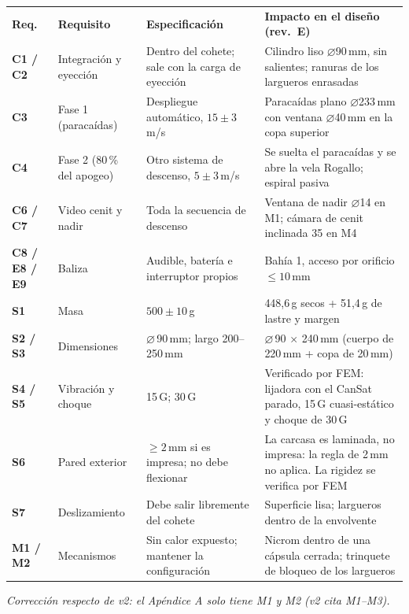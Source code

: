 \documentclass[10pt,a4paper]{article}
\newcommand{\diam}{\ensuremath{\varnothing}}
\newcommand{\nota}[1]{{\par\small\itshape\color{gris}#1\par}\medskip}
\begin{document}
\par{\footnotesize\noindent\begin{tabularx}{\linewidth}{P{1.7cm}P{2.6cm}P{3.6cm}L}
\color{white}\bfseries Req. & \color{white}\bfseries Requisito & \color{white}\bfseries Especificación & \color{white}\bfseries Impacto en el diseño (rev.\ E) \\
\bfseries C1 / C2 & Integración y eyección & Dentro del cohete; sale con la carga de eyección & Cilindro liso \diam90\,mm, sin salientes; ranuras de los largueros enrasadas \\
\bfseries C3 & Fase 1 (paracaídas) & Despliegue automático, $15 \pm 3$\,m/s & Paracaídas plano \diam233\,mm con ventana \diam40\,mm en la copa superior \\
\bfseries C4 & Fase 2 (80\,\% del apogeo) & Otro sistema de descenso, $5 \pm 3$\,m/s & Se suelta el paracaídas y se abre la vela Rogallo; espiral pasiva \\
\bfseries C6 / C7 & Video cenit y nadir & Toda la secuencia de descenso & Ventana de nadir \diam14 en M1; cámara de cenit inclinada 35\textdegree{} en M4 \\
\bfseries C8 / E8 / E9 & Baliza & Audible, batería e interruptor propios & Bahía 1, acceso por orificio $\leq 10$\,mm \\
\bfseries S1 & Masa & $500 \pm 10$\,g & 448,6\,g secos + 51,4\,g de lastre y margen \\
\bfseries S2 / S3 & Dimensiones & \diam\,90\,mm; largo 200--250\,mm & \diam\,90 $\times$ 240\,mm (cuerpo de 220\,mm + copa de 20\,mm) \\
\bfseries S4 / S5 & Vibración y choque & 15\,G; 30\,G & Verificado por FEM: lijadora con el CanSat parado, 15\,G cuasi-estático y choque de 30\,G \\
\bfseries S6 & Pared exterior & $\geq 2$\,mm si es impresa; no debe flexionar & La carcasa es laminada, no impresa: la regla de 2\,mm no aplica. La rigidez se verifica por FEM \\
\bfseries S7 & Deslizamiento & Debe salir libremente del cohete & Superficie lisa; largueros dentro de la envolvente \\
\bfseries M1 / M2 & Mecanismos & Sin calor expuesto; mantener la configuración & Nicrom dentro de una cápsula cerrada; trinquete de bloqueo de los largueros \\
\end{tabularx}}
\par\medskip
\nota{Corrección respecto de v2: el Apéndice A solo tiene M1 y M2 (v2 cita M1--M3).}
\end{document}
